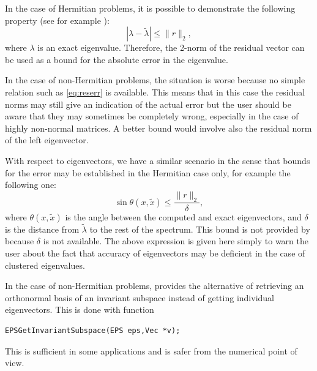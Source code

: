 	In the case of Hermitian problems, it is possible to demonstrate the following property (see for example \citep[ch. 3]{Saad:1992:NML}):
\begin{equation}\label{eq:reserr}
|\lambda-\tilde{\lambda}|\leq \|r\|_2,
\end{equation}
where $\lambda$ is an exact eigenvalue. Therefore, the 2-norm of the residual vector can be used as a bound for the absolute error in the eigenvalue.

	In the case of non-Hermitian problems, the situation is worse because no simple relation such as \eqref{eq:reserr} is available. This means that in this case the residual norms may still give an indication of the actual error but the user should be aware that they may sometimes be completely wrong, especially in the case of highly non-normal matrices. A better bound would involve also the residual norm of the left eigenvector.

	With respect to eigenvectors, we have a similar scenario in the sense that bounds for the error may be established in the Hermitian case only, for example the following one:
\begin{equation}
\sin \theta(x,\tilde{x})\leq \frac{\|r\|_2}{\delta},
\end{equation}
where $\theta(x,\tilde{x})$ is the angle between the computed and exact eigenvectors, and $\delta$ is the distance from $\tilde{\lambda}$ to the rest of the spectrum. This bound is not provided by \slepc because $\delta$ is not available. The above expression is given here simply to warn the user about the fact that accuracy of eigenvectors may be deficient in the case of clustered eigenvalues.

	In the case of non-Hermitian problems, \slepc provides the alternative of retrieving an orthonormal basis of an invariant subspace instead of getting individual eigenvectors. This is done with function
	\begin{Verbatim}[fontsize=\small]
	EPSGetInvariantSubspace(EPS eps,Vec *v);
	\end{Verbatim}
This is sufficient in some applications and is safer from the numerical point of view.

